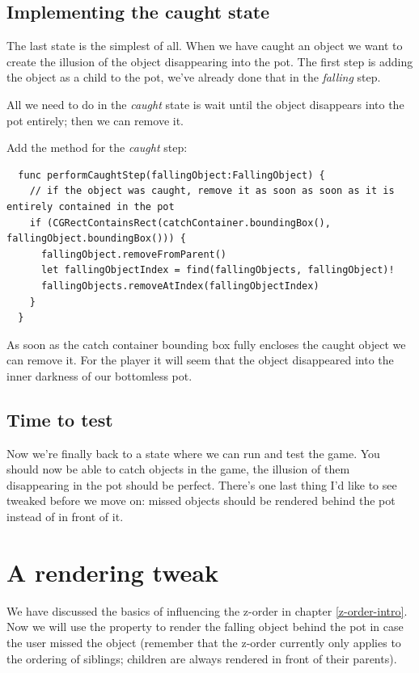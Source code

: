 \subsection{Implementing the caught state}
The last state is the simplest of all. When we have caught an object we want to
create the illusion of the object disappearing into the pot. The first step is
adding the object as a child to the pot, we've already done that in the
\textit{falling} step. 

All we need to do in the \textit{caught} state is wait until the object
disappears into the pot entirely; then we can remove it.

\begin{leftbar}
Add the method for the \textit{caught} step:
\begin{lstlisting}
  func performCaughtStep(fallingObject:FallingObject) {
    // if the object was caught, remove it as soon as soon as it is entirely contained in the pot
    if (CGRectContainsRect(catchContainer.boundingBox(), fallingObject.boundingBox())) {
      fallingObject.removeFromParent()
      let fallingObjectIndex = find(fallingObjects, fallingObject)!
      fallingObjects.removeAtIndex(fallingObjectIndex)
    }
  }
\end{lstlisting}
As soon as the catch container bounding box fully encloses the caught object we
can remove it. For the player it will seem that the object disappeared into the
inner darkness of our bottomless pot.
\end{leftbar}

\subsection{Time to test}
Now we're finally back to a state where we can run and test the game. You should
now be able to catch objects in the game, the illusion of them disappearing in
the pot should be perfect.
There's one last thing I'd like to see tweaked before we move on: missed objects
should be rendered behind the pot instead of in front of it. 

\section{A rendering tweak}\label{rendering_tweak}
We have discussed the basics of influencing the z-order in chapter
\ref{z-order-intro}. Now we will use the  property to render
the falling object behind the pot in case the user missed the object (remember
that the z-order currently only applies to the ordering of siblings; children
are always rendered in front of their parents).

